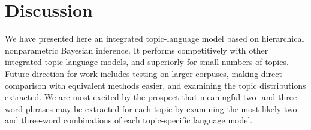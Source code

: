 \section{Discussion}

We have presented here an integrated topic-language model based on hierarchical nonparametric Bayesian inference.  It performs competitively with other integrated topic-language models, and superiorly for small numbers of topics.  Future direction for work includes testing on larger corpuses, making direct comparison with equivalent methods easier, and examining the topic distributions extracted.  We are most excited by the prospect that meaningful two- and three-word phrases may be extracted for each topic by examining the most likely two- and three-word combinations of each topic-specific language model.